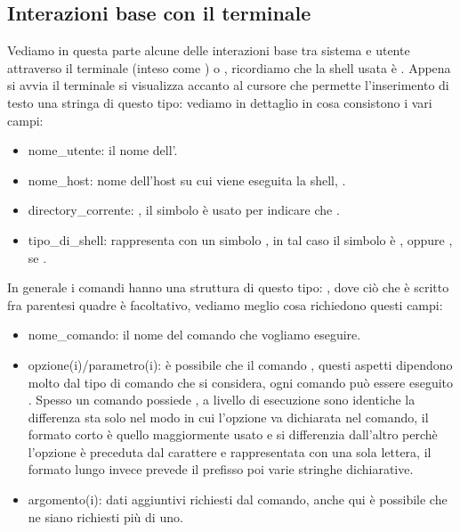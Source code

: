 \subsection{Interazioni base con il terminale}
\label{subsec:Interazioni-base-con-il-terminale}
Vediamo in questa parte alcune delle interazioni base tra sistema e utente attraverso il terminale (inteso come ) o , ricordiamo che la shell usata è . Appena si avvia il terminale si visualizza accanto al cursore che permette l'inserimento di testo una stringa di questo tipo:  vediamo in dettaglio in cosa consistono i vari campi:
\begin{itemize}
    \item nome\_utente: il nome dell'.
    \item nome\_host: nome dell'host su cui viene eseguita la shell, .
    \item directory\_corrente: , il simbolo \ti{$\sim$} è usato per indicare che .
    \item tipo\_di\_shell: rappresenta con un simbolo , in tal caso il simbolo è \ti{\$}, oppure \ti{\#}, se . 
\end{itemize}
In generale i comandi hanno una struttura di questo tipo: , dove ciò che è scritto fra parentesi quadre è facoltativo, vediamo meglio cosa richiedono questi campi:
\begin{itemize}
    \item nome\_comando: il nome del comando che vogliamo eseguire.
    \item opzione(i)/parametro(i): è possibile che il comando , questi aspetti dipendono molto dal tipo di comando che si considera, ogni comando può essere eseguito . Spesso un comando possiede , a livello di esecuzione sono identiche la differenza sta solo nel modo in cui l'opzione va dichiarata nel comando, il formato corto è quello maggiormente usato e si differenzia dall'altro perchè l'opzione è preceduta dal carattere \ti{-} e rappresentata con una sola lettera, il formato lungo invece prevede il prefisso \ti{-}\ti{-} poi varie stringhe dichiarative.   
    \item argomento(i): dati aggiuntivi richiesti dal comando, anche qui è possibile che ne siano richiesti più di uno.
\end{itemize}
